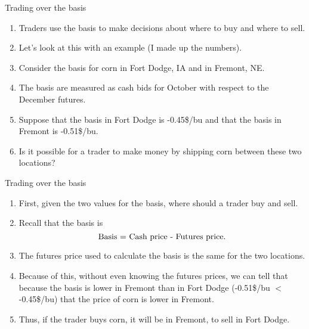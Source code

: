\documentclass[table,xcolor=pdftex,dvipsnames]{beamer}\usepackage[]{graphicx}\usepackage[]{color}
\begin{document}

\begin{frame}{Trading over the basis}
\begin{enumerate}[label=\textbullet]
    \item Traders use the basis to make decisions about where to buy and where to sell.
    \item Let's look at this with an example (I made up the numbers).
    \item Consider the basis for corn in Fort Dodge, IA and in Fremont, NE.
    \item The basis are measured as cash bids for October with respect to the December futures.
    \item  Suppose that the basis in Fort Dodge is -0.45\$/bu and that the basis in Fremont is -0.51\$/bu.
    \item Is it possible for a trader to make money by shipping corn between these two locations?
\end{enumerate}
\end{frame}


\begin{frame}{Trading over the basis}
\begin{enumerate}[label=\textbullet]
    \item First, given the two values for the basis, where should a trader buy and sell.
    \item Recall that the basis is \[ \textnormal{Basis = Cash price - Futures price.} \]
  \vspace{-1\baselineskip}
    \item The futures price used to calculate the basis is the same for the two locations.
    \item Because of this, without even knowing the futures prices, we can tell that because the basis is lower in Fremont than in Fort Dodge (-0.51\$/bu $<$ -0.45\$/bu) that the price of corn is lower in Fremont.
    \item Thus, if the trader buys corn, it will be in Fremont, to sell in Fort Dodge.
\end{enumerate}
\end{frame}

\end{document}
